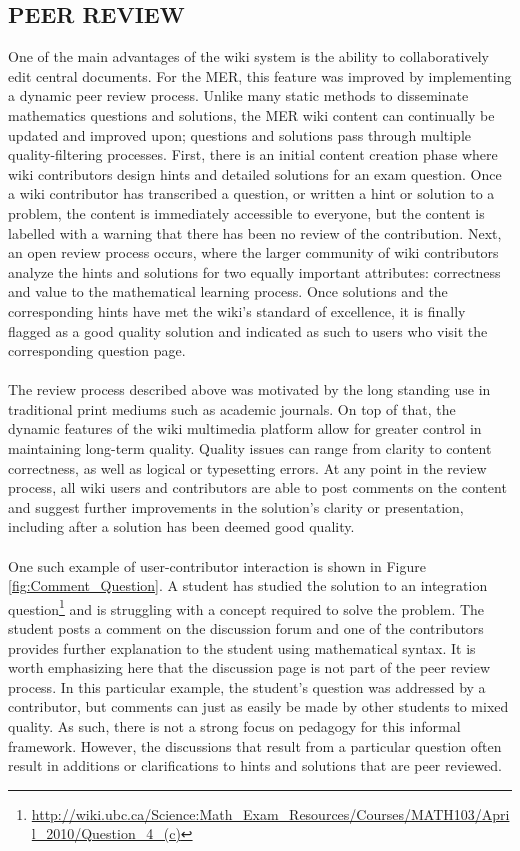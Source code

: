 \documentclass{primus}
\begin{document}
\subsection{PEER REVIEW}\label{sec:Peer_Review}
One of the main advantages of the wiki system is the ability to collaboratively edit central documents. For the MER, this feature was improved by implementing a dynamic peer review process. Unlike many static methods to disseminate mathematics questions and solutions, the MER wiki content can continually be updated and improved upon; questions and solutions pass through multiple quality-filtering processes. First, there is an initial content creation phase where wiki contributors design hints and detailed solutions for an exam question. Once a wiki contributor has transcribed a question, or written a hint or solution to a problem, the content is immediately accessible to everyone, but the content is labelled with a warning that there has been no review of the contribution. Next, an open review process occurs, where the larger community of wiki contributors analyze the hints and solutions for two equally important attributes: correctness and value to the mathematical learning process. Once solutions and the corresponding hints have met the wiki’s standard of excellence, it is finally flagged as a good quality solution and indicated as such to users who visit the corresponding question page.
\\\\
\noindent{}The review process described above was motivated by the long standing use in traditional print mediums such as academic journals. On top of that, the dynamic features of the wiki multimedia platform allow for greater control in maintaining long-term quality. Quality issues can range from clarity to content correctness, as well as logical or typesetting errors. At any point in the review process, all wiki users and contributors are able to post comments on the content and suggest further improvements in the solution’s clarity or presentation, including after a solution has been deemed good quality.
\\\\
\noindent{}One such example of user-contributor interaction is shown in Figure \ref{fig:Comment_Question}. A student has studied the solution to an integration question\footnote{\label{ft:question}\url{http://wiki.ubc.ca/Science:Math_Exam_Resources/Courses/MATH103/April_2010/Question_4_(c)}} and is struggling with a concept required to solve the problem. The student posts a comment on the discussion forum and one of the contributors provides further explanation to the student using mathematical syntax. It is worth emphasizing here that the discussion page is not part of the peer review process. In this particular example, the student's question was addressed by a contributor, but comments can just as easily be made by other students to mixed quality. As such, there is not a strong focus on pedagogy for this informal framework. However, the discussions that result from a particular question often result in additions or clarifications to hints and solutions that are peer reviewed.
\end{document}
